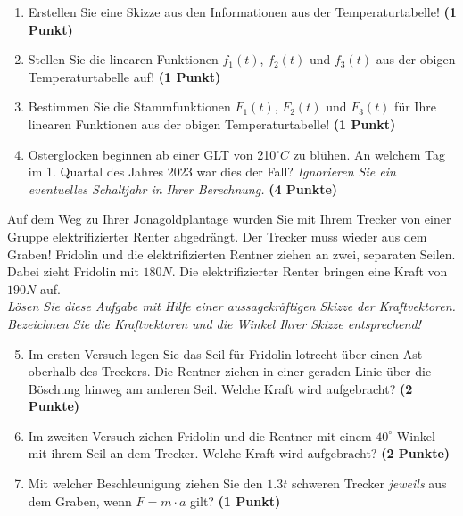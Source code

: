 \documentclass[a4paper, 9pt]{scrartcl}\usepackage[]{graphicx}\usepackage[]{xcolor}
\begin{document}
\begin{enumerate}
\item Erstellen Sie eine Skizze aus den Informationen aus der
  Temperaturtabelle!  \textbf{(1 Punkt)}
\item Stellen Sie die linearen Funktionen $f_1(t)$, $f_2(t)$ und
  $f_3(t)$ aus der obigen Temperaturtabelle auf!  \textbf{(1 Punkt)}
\item Bestimmen Sie die Stammfunktionen $F_1(t)$, $F_2(t)$ und $F_3(t)$ f{\"u}r
  Ihre linearen Funktionen aus der obigen Temperaturtabelle!  \textbf{(1
    Punkt)}
\item Osterglocken beginnen ab einer GLT von 210$^\circ C$ zu bl{\"u}hen. An
  welchem Tag im 1. Quartal des Jahres 2023 war dies der
  Fall? \textit{Ignorieren Sie ein eventuelles Schaltjahr in Ihrer Berechnung.} \textbf{(4 Punkte)}
\end{enumerate}

Auf dem Weg zu Ihrer Jonagoldplantage wurden Sie mit Ihrem Trecker von
einer Gruppe elektrifizierter Renter abgedr{\"a}ngt. Der Trecker muss wieder
aus dem Graben! Fridolin und die elektrifizierten Rentner ziehen an zwei,
separaten Seilen. Dabei zieht Fridolin mit $180N$. Die
elektrifizierter Renter  bringen eine Kraft von $190N$ auf.\\

\textit{L{\"o}sen Sie diese Aufgabe mit Hilfe einer aussagekr{\"a}ftigen Skizze der
  Kraftvektoren. Bezeichnen Sie die Kraftvektoren und die Winkel Ihrer
  Skizze entsprechend!}

\begin{enumerate}
  \setcounter{enumi}{4}  
\item Im ersten Versuch legen Sie das Seil f{\"u}r Fridolin lotrecht {\"u}ber einen
  Ast oberhalb des Treckers. Die Rentner ziehen in einer geraden Linie {\"u}ber
  die B{\"o}schung hinweg am anderen Seil. Welche Kraft wird aufgebracht?
  \textbf{(2 Punkte)}
\item Im zweiten Versuch ziehen Fridolin und die Rentner mit einem
  $40^\circ$ Winkel mit ihrem Seil an dem Trecker. Welche Kraft
  wird aufgebracht? \textbf{(2 Punkte)}
\item Mit welcher Beschleunigung ziehen Sie den $1.3t$ schweren
  Trecker \textit{jeweils} aus dem Graben, wenn $F = m \cdot a$ gilt?
  \textbf{(1 Punkt)}
\end{enumerate}

 
\clearpage
\end{document}
